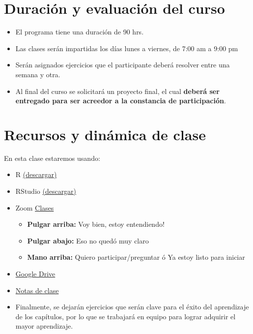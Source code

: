 \documentclass[
]{book}
\providecommand{\tightlist}{%
  \setlength{\itemsep}{0pt}\setlength{\parskip}{0pt}}
\begin{document}
\hypertarget{duraciuxf3n-y-evaluaciuxf3n-del-curso}{%
\section*{Duración y evaluación del curso}\label{duraciuxf3n-y-evaluaciuxf3n-del-curso}}

\begin{itemize}
\item
  El programa tiene una duración de 90 hrs.
\item
  Las clases serán impartidas los días lunes a viernes, de 7:00 am a 9:00 pm
\item
  Serán asignados ejercicios que el participante deberá resolver entre una semana y otra.
\item
  Al final del curso se solicitará un proyecto final, el cual \textbf{deberá ser entregado para ser acreedor a la constancia de participación}.
\end{itemize}

\hypertarget{recursos-y-dinuxe1mica-de-clase}{%
\section*{Recursos y dinámica de clase}\label{recursos-y-dinuxe1mica-de-clase}}

En esta clase estaremos usando:

\begin{itemize}
\item
  R \href{https://cran.r-project.org/}{(descargar)}
\item
  RStudio \href{https://www.rstudio.com/products/rstudio/download/}{(descargar)}
\item
  Zoom \href{}{Clases}

  \begin{itemize}
  \tightlist
  \item
    \textbf{Pulgar arriba:} Voy bien, estoy entendiendo!
  \item
    \textbf{Pulgar abajo:} Eso no quedó muy claro
  \item
    \textbf{Mano arriba:} Quiero participar/preguntar ó Ya estoy listo para iniciar
  \end{itemize}
\item
  \href{}{Google Drive}
\item
  \href{https://acturio.github.io/amt22_aserta_intro2dsml/}{Notas de clase}
\item
  Finalmente, se dejarán ejercicios que serán clave para el éxito del aprendizaje de los capítulos, por lo que se trabajará en equipo para lograr adquirir el mayor aprendizaje.
\end{itemize}

  
\end{document}
